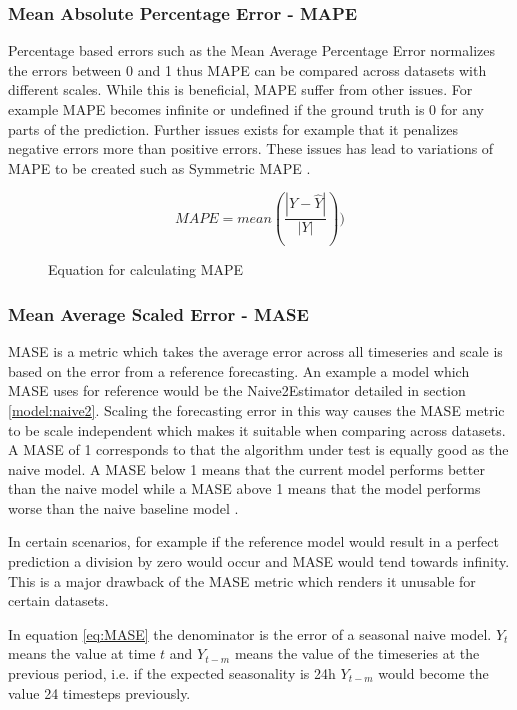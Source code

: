 \subsubsection{Mean Absolute Percentage Error - MAPE}
Percentage based errors such as the Mean Average Percentage Error normalizes the errors between 0 and 1 thus MAPE can be compared across datasets with different scales. While this is beneficial, MAPE suffer from other issues. For example MAPE becomes infinite or undefined if the ground truth is 0 for any parts of the prediction. Further issues exists for example that it penalizes negative errors more than positive errors. These issues has lead to variations of MAPE to be created such as Symmetric MAPE \cite{hyndman_forecasting_3rd,gluonts-github}.

\begin{figure}[h]
  \[MAPE = mean(\frac{|Y - \hat{Y}|}{|Y|}))\]
  \caption{Equation for calculating MAPE}
  \label{eq:MAPE}
\end{figure}

\subsubsection{Mean Average Scaled Error - MASE}
MASE is a metric which takes the average error across all timeseries and scale is based on the error from a reference forecasting. An example a model which MASE uses for reference would be the Naive2Estimator detailed in section \ref{model:naive2}. Scaling the forecasting error in this way causes the MASE metric to be scale independent which makes it suitable when comparing across datasets. A MASE of 1 corresponds to that the algorithm under test is equally good as the naive model. A MASE below 1 means that the current model performs better than the naive model while a MASE above 1 means that the model performs worse than the naive baseline model \cite{hyndman_forecasting_3rd,gluonts-github}.

In certain scenarios, for example if the reference model would result in a perfect prediction a division by zero would occur and MASE would tend towards infinity. This is a major drawback of the MASE metric which renders it unusable for certain datasets.

In equation \ref{eq:MASE} the denominator is the error of a seasonal naive model. \(Y_t\) means the value at time \(t\) and \(Y_{t-m}\) means the value of the timeseries at the previous period, i.e. if the expected seasonality is 24h \(Y_{t-m}\) would become the value 24 timesteps previously.

